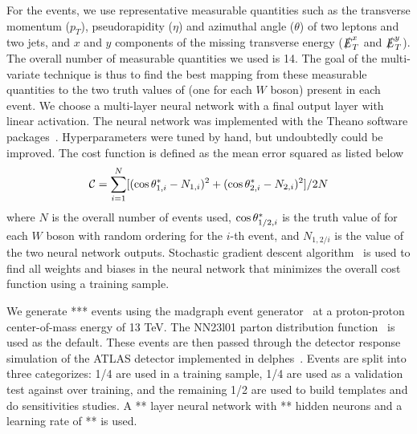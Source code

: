 For the \ssWW events, we use representative measurable quantities such as the transverse momentum ($p_T$), pseudorapidity ($\eta$) and 
azimuthal angle ($\theta$) of two leptons and two jets, and $x$ and $y$ components of the missing transverse energy ($\slashed{E}_T^x$ and $\slashed{E}_T^y$). 
The overall number of measurable quantities we used is 14. The goal of the multi-variate technique is thus to find the best mapping from these measurable quantities 
to the two truth values of \cts (one for each $W$ boson) present in each event. 
We choose a multi-layer neural network with a final output layer with linear activation. The neural network was implemented with the 
Theano software packages~\cite{theano}. Hyperparameters were tuned by hand, but undoubtedly could be improved. 
The cost function is defined as the mean error squared as listed below
\small
\begin{equation}
{\cal{C}}= \sum_{i=1}^{N} [(\ctsnb_{1,i} -N_{1,i})^2+(\ctsnb_{2,i}-N_{2,i})^2]/2N
\end{equation}
\normalsize
where $N$ is the overall number of events used, $ \cos  \theta^{*}  _{1/2,i}$ is the truth value of \cts for each $W$ boson with random ordering for the $i$-th event, 
and $N_{1,2/i}$ is the value of the two neural network outputs. 
Stochastic gradient descent algorithm~\cite{sgd} is used to find all weights and biases in the neural network that minimizes the overall cost function using a training sample. 

We generate *** \ssWW events using the {\sc madgraph} event generator~\cite{madgraph} at a proton-proton center-of-mass energy of 13 TeV. 
The NN23l01 parton distribution function~\cite{pdf} is used as the default. These events are then 
passed through the detector response simulation of the ATLAS detector implemented in {\sc delphes}~\cite{delphes}. 
Events are split into three categorizes: 1/4 are used in a training sample, 1/4 are used as a validation test against over training, and the remaining 1/2 
are used to build templates and do sensitivities studies. A ** layer neural network with ** hidden neurons and a learning rate of ** is used.


